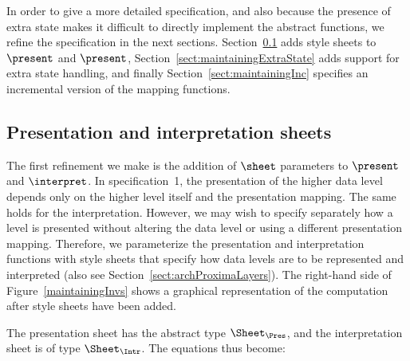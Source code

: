 In order to give a more detailed specification, and also because the presence of extra state makes it difficult to directly implement the abstract functions, we refine the specification in the next sections. Section~\ref{sect:maintainingSheet} adds style sheets to $\present$ and $\present$, Section~\ref{sect:maintainingExtraState} adds support for extra state handling, and finally Section~\ref{sect:maintainingInc} specifies an incremental version of the mapping functions.


%																
%																
%																
\subsection{Presentation and interpretation sheets} \label{sect:maintainingSheet}

The first refinement we make is the addition of $\sheet$ parameters to $\present$ and $\interpret$. In specification~1, the presentation of the higher data level depends only on the higher level itself and the presentation mapping. The same holds for the interpretation. However, we may wish to specify separately how a level is presented without altering the data level or using a different presentation mapping. Therefore, we parameterize the presentation and interpretation functions with style sheets that specify how data levels are to be represented and interpreted (also see Section~\ref{sect:archProximaLayers}). The right-hand side of Figure~\ref{maintainingInvs} shows a graphical representation of the computation after style sheets have been added. 

The presentation sheet has the abstract type $\Sheet_{\Pres}$, and the interpretation sheet is of type $\Sheet_{\Intr}$. The equations thus become:

